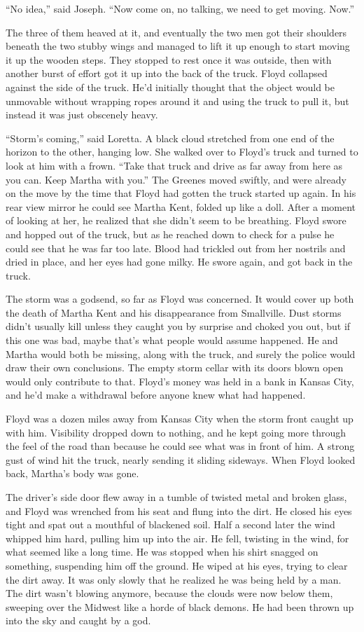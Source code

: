 ``No idea,'' said Joseph. ``Now come on, no talking, we need to get
moving. Now.''

The three of them heaved at it, and eventually the two men got their
shoulders beneath the two stubby wings and managed to lift it up enough
to start moving it up the wooden steps. They stopped to rest once it was
outside, then with another burst of effort got it up into the back of
the truck. Floyd collapsed against the side of the truck. He'd initially
thought that the object would be unmovable without wrapping ropes around
it and using the truck to pull it, but instead it was just obscenely
heavy.

``Storm's coming,'' said Loretta. A black cloud stretched from one end
of the horizon to the other, hanging low. She walked over to Floyd's
truck and turned to look at him with a frown. ``Take that truck and
drive as far away from here as you can. Keep Martha with you.'' The
Greenes moved swiftly, and were already on the move by the time that
Floyd had gotten the truck started up again. In his rear view mirror he
could see Martha Kent, folded up like a doll. After a moment of looking
at her, he realized that she didn't seem to be breathing. Floyd swore
and hopped out of the truck, but as he reached down to check for a pulse
he could see that he was far too late. Blood had trickled out from her
nostrils and dried in place, and her eyes had gone milky. He swore
again, and got back in the truck.

The storm was a godsend, so far as Floyd was concerned. It would cover
up both the death of Martha Kent and his disappearance from Smallville.
Dust storms didn't usually kill unless they caught you by surprise and
choked you out, but if this one was bad, maybe that's what people would
assume happened. He and Martha would both be missing, along with the
truck, and surely the police would draw their own conclusions. The empty
storm cellar with its doors blown open would only contribute to that.
Floyd's money was held in a bank in Kansas City, and he'd make a
withdrawal before anyone knew what had happened.

Floyd was a dozen miles away from Kansas City when the storm front
caught up with him. Visibility dropped down to nothing, and he kept
going more through the feel of the road than because he could see what
was in front of him. A strong gust of wind hit the truck, nearly sending
it sliding sideways. When Floyd looked back, Martha's body was gone.

The driver's side door flew away in a tumble of twisted metal and broken
glass, and Floyd was wrenched from his seat and flung into the dirt. He
closed his eyes tight and spat out a mouthful of blackened soil. Half a
second later the wind whipped him hard, pulling him up into the air. He
fell, twisting in the wind, for what seemed like a long time. He was
stopped when his shirt snagged on something, suspending him off the
ground. He wiped at his eyes, trying to clear the dirt away. It was only
slowly that he realized he was being held by a man. The dirt wasn't
blowing anymore, because the clouds were now below them, sweeping over
the Midwest like a horde of black demons. He had been thrown up into the
sky and caught by a god.


